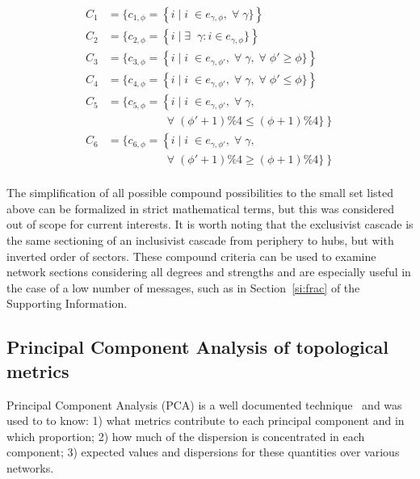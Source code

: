 \documentclass[%
	aip,
	jmp,%
	amsmath,amssymb,
	reprint,%
]{revtex4-1}
\begin{document}
\begin{equation}
	\begin{split}
		C_1&=\{c_{1,\phi}=\left\{i\mid i\;\in e_{\gamma,\phi}, \;\forall\; \gamma\}\right\} \\
		C_2&=\{c_{2,\phi}=\left\{i\mid \exists \;\;\gamma: i \in e_{\gamma,\phi}\}\right\} \\
		C_3&=\{c_{3,\phi}=\left\{i\mid i\;\in e_{\gamma,\phi'}, \;\forall\; \gamma,\;\forall\;\phi'\geq \phi\}\right\} \\
		C_4&=\{c_{4,\phi}=\left\{i\mid i\;\in e_{\gamma,\phi'}, \;\forall\; \gamma,\;\forall\;\phi'\leq \phi\}\right\} \\
		C_5&=\{c_{5,\phi}=\left\{i\mid i\;\in e_{\gamma,\phi'}, \;\forall\; \gamma,\right.\\
																																	&\;\;\;\;\;\;\;\;\;\;\;\;\;\;\;\;\;\; \left.\;\forall\;(\phi'+1)\%4\leq (\phi+1)\%4\}\right\} \\
		C_6&=\{c_{6,\phi}=\left\{i\mid i\;\in e_{\gamma,\phi'}, \;\forall\; \gamma,\right.\\
																																	&\;\;\;\;\;\;\;\;\;\;\;\;\;\;\;\;\;\; \left.\;\forall\;(\phi'+1)\%4\geq (\phi+1)\%4\}\right\} \\
	\end{split}
\end{equation}

The simplification of all possible compound possibilities to the small set listed above can be formalized in strict mathematical terms, but this was considered out of scope for current interests. It is worth noting that the exclusivist cascade is the same sectioning of an inclusivist cascade from periphery to hubs, but with inverted order of sectors. These compound criteria can be used to examine network sections considering all degrees and strengths and are especially useful in the case of a low number of messages, such as in Section~\ref{si:frac} of the Supporting Information.

\subsection{Principal Component Analysis of topological metrics}\label{sec:pca}
Principal Component Analysis (PCA) is a well documented technique~\cite{pca} and was used to to know: 1) what metrics contribute to each principal component and in which proportion; 2) how much of the dispersion is concentrated in each component; 3) expected values and dispersions for these quantities over various networks.
\end{document}
